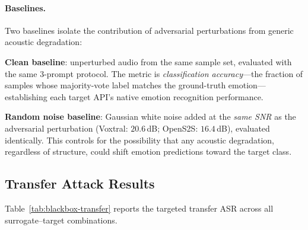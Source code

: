 \paragraph{Baselines.}
Two baselines isolate the contribution of adversarial perturbations from generic acoustic degradation:
\begin{packeditemize}
\item \textbf{Clean baseline}: unperturbed audio from the same sample set, evaluated with the same 3-prompt protocol.
The metric is \emph{classification accuracy}---the fraction of samples whose majority-vote label matches the ground-truth emotion---establishing each target API's native emotion recognition performance.
\item \textbf{Random noise baseline}: Gaussian white noise added at the \emph{same SNR} as the adversarial perturbation (Voxtral: $20.6$\,dB; OpenS2S: $16.4$\,dB), evaluated identically.
This controls for the possibility that any acoustic degradation, regardless of structure, could shift emotion predictions toward the target class.
\end{packeditemize}

\subsection{Transfer Attack Results}
\label{sec:bb_results}

Table~\ref{tab:blackbox-transfer} reports the targeted transfer ASR across all surrogate--target combinations.

\begin{table}[t]
\centering
\caption{Black-box targeted transfer ASR (\%) across surrogate--target combinations.
Each cell shows the fraction of adversarial samples whose majority-vote label equals the target emotion \texttt{happy}.
Values $> 15\%$ are \textbf{bolded}; dashes indicate experiments pending execution.}
\label{tab:blackbox-transfer}
\end{table}

